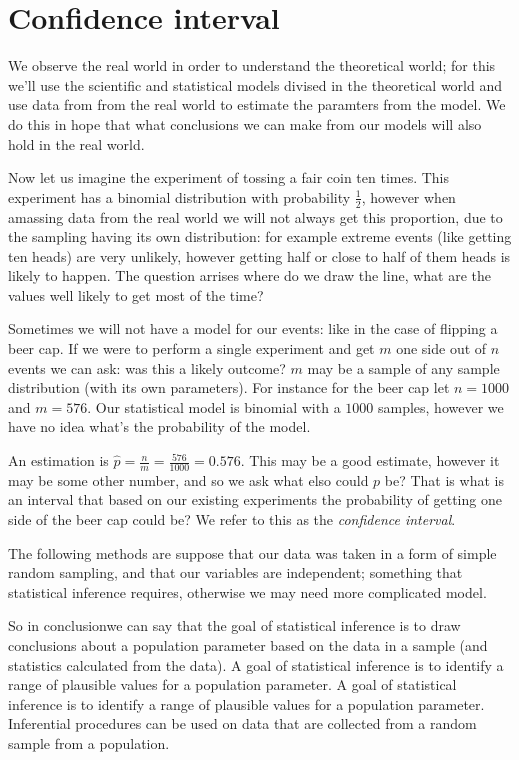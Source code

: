 \chapter*{Confidence interval}

\setcounter{section}{0}
\renewcommand*{\theHsection}{ch4.\the\value{section}}

We observe the real world in order to understand the theoretical world; for this
we'll use the scientific and statistical models divised in the theoretical world
and use data from from the real world to estimate the paramters from the model.
We do this in hope that what conclusions we can make from our models will also
hold in the real world.


Now let us imagine the experiment of tossing a fair coin ten times. This
experiment has a binomial distribution with probability $\frac{1}{2}$, however
when amassing data from the real world we will not always get this proportion,
due to the sampling having its own distribution: for example extreme events
(like getting ten heads) are very unlikely, however getting half or close to
half of them heads is likely to happen. The question arrises where do we draw
the line, what are the values well likely to get most of the time?

Sometimes we will not have a model for our events: like in the case of flipping
a beer cap. If we were to perform a single experiment and get $m$ one side
out of $n$ events we can ask: was this a likely outcome? $m$ may be a sample of
any sample distribution (with its own parameters). For instance for the beer cap
let $n=1000$ and $m=576$. Our statistical model is binomial with a $1000$
samples, however we have no idea what's the probability of the model. 

An estimation is $\hat{p}=\frac{n}{m}=\frac{576}{1000}=0.576$. This may be a
good estimate, however it may be some other number, and so we ask what elso
could $p$ be? That is what is an interval that based on our existing experiments
the probability of getting one side of the beer cap could be? We refer to this
as the \emph{confidence interval}. 

The following methods are suppose that our data was taken in a form of simple
random sampling, and that our variables are independent; something that
statistical inference requires, otherwise we may need more complicated model.

So in conclusionwe can say that the goal of statistical inference is to draw
conclusions about a population parameter based on the data in a sample (and
statistics calculated from the data). A goal of statistical inference is to
identify a range of plausible values for a population parameter. A goal of
statistical inference is to identify a range of plausible values for a
population parameter. Inferential procedures can be used on data that are
collected from a random sample from a population.


